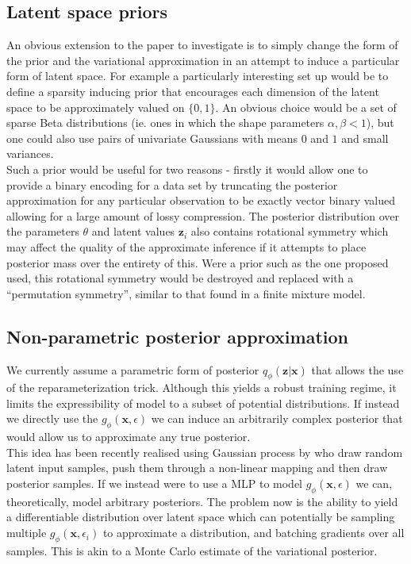 \documentclass[../report.tex]{subfiles}
\begin{document}
\subsection{Latent space priors}
An obvious extension to the paper to investigate is to simply change the form of the prior and the variational approximation in an attempt to induce a particular form of latent space. For example a particularly interesting set up would be to define a sparsity inducing prior that encourages each dimension of the latent space to be approximately valued on $\{0, 1\}$. An obvious choice would be a set of sparse Beta distributions (ie. ones in which the shape parameters $\alpha, \beta < 1$), but one could also use pairs of univariate Gaussians with means $0$ and $1$ and small variances.\\

Such a prior would be useful for two reasons - firstly it would allow one to provide a binary encoding for a data set by truncating the posterior approximation for any particular observation to be exactly vector binary valued allowing for a large amount of lossy compression. The posterior distribution over the parameters $\theta$ and latent values $\mathbf{z}_i$ also contains rotational symmetry which may affect the quality of the approximate inference if it attempts to place posterior mass over the entirety of this. Were a prior such as the one proposed used, this rotational symmetry would be destroyed and replaced with a ``permutation symmetry'', similar to that found in a finite mixture model.
\\
\subsection{Non-parametric posterior approximation}
We currently assume a parametric form of posterior $q_\phi(\mathbf{z}|\mathbf{x})$ that allows the use of the reparameterization trick. Although this yields a robust training regime, it limits the expressibility of model to a subset of potential distributions. If instead we directly use the $g_\phi(\mathbf{x}, \epsilon)$ we can induce an arbitrarily complex posterior that would allow us to approximate any true posterior.\\
This idea has been recently realised using Gaussian process by \cite{tran2015variational} who draw random latent input samples, push them through a non-linear mapping and then draw posterior samples. If we instead were to use a MLP to model $g_\phi(\mathbf{x}, \epsilon)$ we can, theoretically, model arbitrary posteriors. The problem now is the ability to yield a differentiable distribution over latent space which can potentially be sampling multiple $g_\phi(\mathbf{x}, \epsilon_i)$ to approximate a distribution, and batching gradients over all samples. This is akin to a Monte Carlo estimate of the variational posterior.
\end{document}
